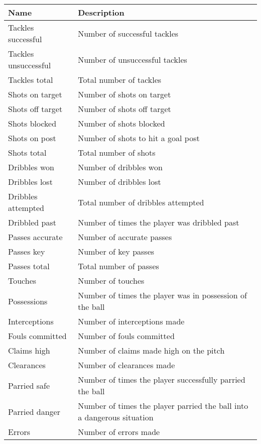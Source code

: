 \begin{table}
    \centering
    \noindent\begin{tabulary}{\textwidth}{| L | L |}
        \hline
        \textbf{Name}           & \textbf{Description} \\\hline
        Tackles successful      & Number of successful tackles \\\hline
        Tackles unsuccessful    & Number of unsuccessful tackles \\\hline
        Tackles total           & Total number of tackles \\\hline
        
        Shots on target         & Number of shots on target \\\hline
        Shots off target        & Number of shots off target \\\hline
        Shots blocked           & Number of shots blocked \\\hline
        Shots on post           & Number of shots to hit a goal post \\\hline
        Shots total             & Total number of shots \\\hline
        
        Dribbles won            & Number of dribbles won \\\hline
        Dribbles lost           & Number of dribbles lost \\\hline
        Dribbles attempted      & Total number of dribbles attempted \\\hline
        Dribbled past           & Number of times the player was dribbled past \\\hline
        
        Passes accurate         & Number of accurate passes \\\hline
        Passes key              & Number of key passes \\\hline
        Passes total            & Total number of passes \\\hline
        
        Touches                 & Number of touches \\\hline
        Possessions             & Number of times the player was in possession of the ball \\\hline
        
        Interceptions           & Number of interceptions made \\\hline
        Fouls committed         & Number of fouls committed \\\hline
        Claims high             & Number of claims made high on the pitch \\\hline
        Clearances              & Number of clearances made \\\hline
        Parried safe            & Number of times the player successfully parried the ball \\\hline
        Parried danger          & Number of times the player parried the ball into a dangerous situation \\\hline
        Errors                  & Number of errors made \\\hline
        

\end{tabulary}
\end{table}
